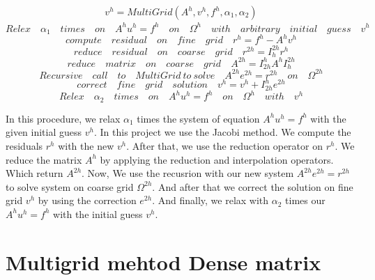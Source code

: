 \begin{align}
	v^h = MultiGrid(A^h, v^h,f^h,\alpha_1, \alpha_2)
	\label{eq:main} 
\end{align}
\begin{equation}
	Relex\quad \alpha_1 \quad times\quad on\quad A^h u^h = f^h \quad on \quad  \Omega^h \quad with \quad arbitrary \quad initial \quad guess \quad v^h
	\label{eq:relax}
\end{equation}
\begin{equation}
\label{eq:computeB}
	compute \quad residual \quad on \quad  fine \quad  grid \quad r^h = f^h - A^hv^h
\end{equation}
\begin{equation}
\label{eq:computeB2h}
	reduce \quad residual \quad on \quad  coarse \quad  grid \quad r^{2h} = I^{2h}_h r^h
\end{equation}
\begin{equation}
	reduce \quad matrix \quad on \quad  coarse \quad  grid \quad A^{2h} = I^{h}_{2h} A^h I_{h}^{2h}
\end{equation}
\begin{equation}
\label{eq:recursivecall}
	Recursive\quad call\quad to\quad MultiGrid \  to \  solve \quad A^{2h}e^{2h} = r^{2h} \quad on \quad \Omega^{2h}
\end{equation}
\begin{equation}
\label{eq:addx}
	correct \quad fine \quad grid \quad solution \quad v^h = v^h + I_{2h}^he^{2h}
\end{equation}
\begin{equation}
	Relex\quad \alpha_2 \quad times\quad on\quad A^h u^h = f^h \quad on \quad  \Omega^h \quad with \quad v^h
\end{equation}

In this procedure, we relax  $\alpha_1$ times the system of equation $A^h u^h = f^h$ with the given initial guess $v^h$. In this project we use the Jacobi method. We  compute the residuals $r^h$ with the new $v^h$. After that, we  use the reduction operator on $r^h$. We  reduce the matrix $A^h$ by applying the reduction and interpolation operators. Which return $A^{2h}$. Now, We use the recusrion with our new system $A^{2h}e^{2h} = r^{2h}$ to solve system on coarse grid $\Omega^{2h}$. And after that we correct the solution on fine grid $v^h$ by using the correction $e^{2h}$. And finally, we relax with $\alpha_2$ times our $A^h u^h = f^h$ with the initial guess $v^h$.
\section{Multigrid mehtod Dense matrix}

